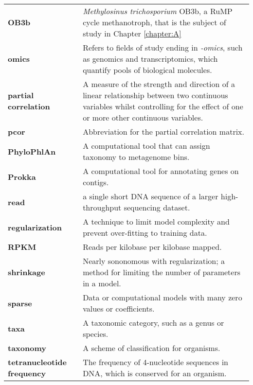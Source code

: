 \begin{singlespace}
\begin{longtable}{ p{}  p{} }
\textbf{OB3b} & \textit{Methylosinus trichosporium} {OB3b}, a RuMP cycle methanotroph, that is the subject of study in Chapter \ref{chapter:A}  \\
\textbf{omics} & Refers to fields of study ending in \textit{-omics}, such as genomics and transcriptomics, which quantify pools of biological molecules. \\
\textbf{partial correlation} & A measure of the strength and direction of a linear relationship between two continuous variables whilst controlling for the effect of one or more other continuous variables. \\
\textbf{pcor} & Abbreviation for the partial correlation matrix. \\
\textbf{PhyloPhlAn} & A computational tool that can assign taxonomy to metagenome bins. \\
\textbf{Prokka} & A computational tool for annotating genes on contigs. \\
\textbf{read} & a single short DNA sequence of a larger high-throughput sequencing dataset. \\
\textbf{regularization} & A technique to limit model complexity and prevent over-fitting to training data. \\
\textbf{RPKM} & Reads per kilobase per kilobase mapped. \\ %
\textbf{shrinkage} & Nearly sononomous with regularization; a method for limiting the number of parameters in a model. \\
\textbf{sparse} & Data or computational models with many zero values or coefficients. \\
\textbf{taxa} & A taxonomic category, such as a genus or species. \\
\textbf{taxonomy} & A scheme of classification for organisms. \\
\textbf{tetranucleotide frequency} & The frequency of 4-nucleotide sequences in DNA, which is conserved for an organism. \\

\end{longtable}
\end{singlespace}
